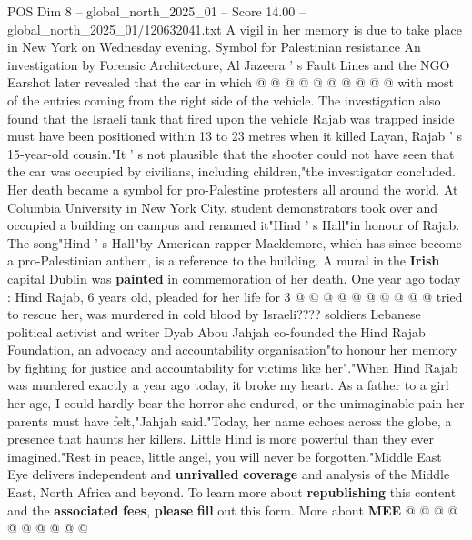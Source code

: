 \begin{textsample}{POS Dim 8 – global\_north\_2025\_01 – Score 14.00 – global\_north\_2025\_01/120632041.txt}
A vigil in her memory is due to take place in New York on Wednesday evening.
Symbol for Palestinian resistance An investigation by Forensic Architecture, Al Jazeera ' s Fault Lines and the NGO Earshot later revealed that the car in which @ @ @ @ @ @ @ @ @ @ with most of the entries coming from the right side of the vehicle.
The investigation also found that the Israeli tank that fired upon the vehicle Rajab was trapped inside must have been positioned within 13 to 23 metres when it killed Layan, Rajab ' s 15-year-old cousin."It ' s not plausible that the shooter could not have seen that the car was occupied by civilians, including children,"the investigator concluded.
Her death became a symbol for pro-Palestine protesters all around the world.
At Columbia University in New York City, student demonstrators took over and occupied a building on campus and renamed it"Hind ' s Hall"in honour of Rajab.
The song"Hind ' s Hall"by American rapper Macklemore, which has since become a pro-Palestinian anthem, is a reference to the building.
A mural in the \textbf{Irish} capital Dublin was \textbf{painted} in commemoration of her death.
One year ago today : Hind Rajab, 6 years old, pleaded for her life for 3 @ @ @ @ @ @ @ @ @ @ tried to rescue her, was murdered in cold blood by Israeli???? soldiers Lebanese political activist and writer Dyab Abou Jahjah co-founded the Hind Rajab Foundation, an advocacy and accountability organisation"to honour her memory by fighting for justice and accountability for victims like her"."When Hind Rajab was murdered exactly a year ago today, it broke my heart.
As a father to a girl her age, I could hardly bear the horror she endured, or the unimaginable pain her parents must have felt,"Jahjah said."Today, her name echoes across the globe, a presence that haunts her killers.
Little Hind is more powerful than they ever imagined."Rest in peace, little angel, you will never be forgotten."Middle East Eye delivers independent and \textbf{unrivalled} \textbf{coverage} and analysis of the Middle East, North Africa and beyond.
To learn more about \textbf{republishing} this content and the \textbf{associated} \textbf{fees}, \textbf{please} \textbf{fill} out this form.
More about \textbf{MEE} @ @ @ @ @ @ @ @ @ @

\end{textsample}
